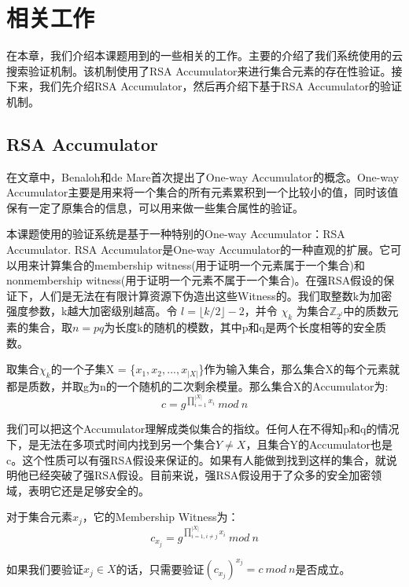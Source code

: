 \chapter{相关工作}
\label{chap:relatedwork}
在本章，我们介绍本课题用到的一些相关的工作。主要的介绍了我们系统使用的云搜索验证机制。该机制使用了RSA Accumulator\cite{goodrich2002efficient,verifiableindex}来进行集合元素的存在性验证。接下来，我们先介绍RSA Accumulator，然后再介绍下基于RSA Accumulator的验证机制。

\section{RSA Accumulator}
在文章\cite{benaloh1994one}中，Benaloh和de Mare首次提出了One-way Accumulator的概念。One-way Accumulator主要是用来将一个集合的所有元素累积到一个比较小的值，同时该值保有一定了原集合的信息，可以用来做一些集合属性的验证。

本课题使用的验证系统是基于一种特别的One-way Accumulator：RSA Accumulator.
RSA Accumulator是One-way Accumulator\cite{benaloh1994one}的一种直观的扩展。它可以用来计算集合的membership witness(用于证明一个元素属于一个集合)和nonmembership witness(用于证明一个元素不属于一个集合)。在强RSA假设的保证下\cite{baric1997collision}，人们是无法在有限计算资源下伪造出这些Witness的。我们取整数k为加密强度参数，k越大加密级别越高。令 $l = \lfloor k/2 \rfloor - 2$，并令 $\chi_k$ 为集合$\mathbb{Z}_{2^l}$中的质数元素的集合，取$n = pq$为长度k的随机的模数，其中p和q是两个长度相等的安全质数。

取集合$\chi_k$的一个子集X = \{$x_1, x_2, ... , x_{|X|}$\}作为输入集合，那么集合X的每个元素就都是质数，并取g为n的一个随机的二次剩余模量。那么集合X的Accumulator为:
\begin{equation} c = g^{\prod_{i = 1}^{|X|} x_i}\ mod\ n \end{equation}

我们可以把这个Accumulator理解成类似集合的指纹。任何人在不得知p和q的情况下，是无法在多项式时间内找到另一个集合$Y \neq X$，且集合Y的Accumulator也是c。这个性质可以有强RSA假设来保证的。如果有人能做到找到这样的集合，就说明他已经突破了强RSA假设。目前来说，强RSA假设用于了众多的安全加密领域，表明它还是足够安全的。

对于集合元素$x_j$，它的Membership Witness为：
\begin{equation} \label{eq:sw} c_{x_j} = g^{\prod_{i=1, i \ne j}^{|X|} x_i}\ mod\ n \end{equation}

如果我们要验证$x_j \in X$的话，只需要验证$(c_{x_j})^{x_j} = c\ mod\ n$是否成立。

